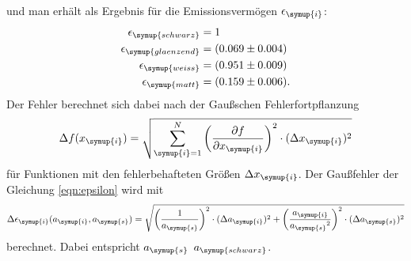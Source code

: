 und man erhält als Ergebnis für die Emissionsvermögen $\epsilon_\symup{i}$:
\begin{align*}
  \epsilon_\symup{schwarz}   &= 1 \\
  \epsilon_\symup{glaenzend} &= (0.069\pm0.004) \\
  \epsilon_\symup{weiss}     &= (0.951\pm0.009) \\
  \epsilon_\symup{matt}      &= (0.159\pm0.006).
\end{align*}
Der Fehler berechnet sich dabei nach der Gaußschen Fehlerfortpflanzung
\begin{equation}
  \Delta f(x_\symup{i}) = \sqrt{\sum_{\symup{i}=1}^N
  \left(\frac{\partial f}{\partial x_\symup{i}}\right)^2 \cdot
  (\Delta x_\symup{i})^2}
  \label{eqn:gaussfehler-allgemein}
\end{equation}
für Funktionen mit den fehlerbehafteten Größen $\Delta x_\symup{i}$.
Der Gaußfehler der Gleichung \eqref{eqn:epsilon} wird mit
\begin{equation}
  \Delta \epsilon_\symup{i}(a_\symup{i},a_\symup{s}) =
  \sqrt{\left(\frac{1}{a_\symup{s}}\right)^2\cdot(\Delta a_\symup{i})^2
  + \left(\frac{a_\symup{i}}{{a_\symup{s}}^2}\right)^2
  \cdot(\Delta a_\symup{s})^2}
  \label{eqn:gaussfehler-epsilon}
\end{equation}
berechnet. Dabei entspricht $a_\symup{s}$ $a_\symup{schwarz}$.



